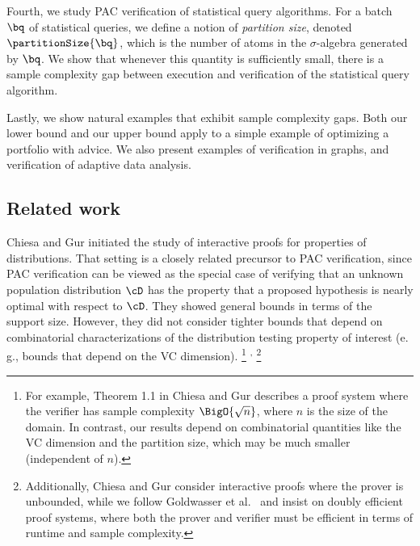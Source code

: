 \documentclass[11pt]{article}
\newcommand{\eg}{e.\,g.}
\begin{document}
Fourth, we study PAC verification of statistical query algorithms. For a batch $\bq$ of statistical queries, we define a notion of \emph{partition size}, denoted $\partitionSize{\bq}$, which is the number of atoms in the $\sigma$-algebra generated by $\bq$. We show that whenever this quantity is sufficiently small, there is a sample complexity gap between execution and verification of the statistical query algorithm. 

Lastly, we show natural examples that exhibit sample complexity gaps. Both our lower bound and our upper bound apply to a simple example of optimizing a portfolio with advice. We also present examples of verification in graphs, and verification of adaptive data analysis. 


%
\subsection{Related work}  %

Chiesa and Gur \cite{ChiesaG18} initiated the study of interactive proofs for properties of distributions. That setting is a closely related precursor to PAC verification, since PAC verification can be viewed as the special case of verifying that an unknown population distribution $\cD$ has the property that a proposed hypothesis is nearly optimal with respect to $\cD$.
They showed general bounds in terms of the support size. However, they did not consider tighter bounds that depend on combinatorial characterizations of the distribution testing property of interest (\eg, bounds that depend on the VC dimension).%
\footnote{
	For example, Theorem 1.1 in Chiesa and Gur \cite{ChiesaG18} describes a proof system where the verifier has sample complexity $\BigO{\sqrt{n}}$, where $n$ is the size of the domain. In contrast, our results depend on combinatorial quantities like the VC dimension and the partition size, which may be much smaller (independent of $n$).
}%
\textsuperscript{,}%
\footnote{
	Additionally, Chiesa and Gur \cite{ChiesaG18} consider interactive proofs where the prover is unbounded, while we follow Goldwasser et al.\ \cite{GoldwasserRSY21} and insist on doubly efficient proof systems, where both the prover and verifier must be efficient in terms of runtime and sample complexity.
}
\end{document}
